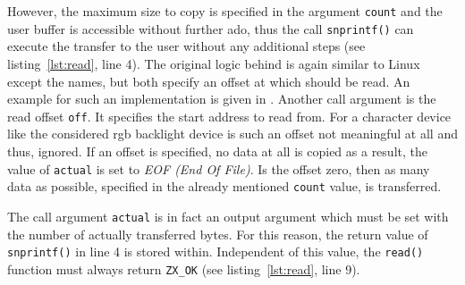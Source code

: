 However, the maximum size to copy is specified in the argument \texttt{count} and the user buffer is accessible without further ado, thus the call \texttt{snprintf()} can execute the transfer to the user without any additional steps (see listing~\ref{lst:read}, line 4).
The original logic behind is again similar to Linux except the names, but both specify an offset at which should be read.
An example for such an implementation is given in \cite{zircon-simpledrv}.
Another call argument is the read offset \texttt{off}.
It specifies the start address to read from.
For a character device like the considered \ac{rgb} backlight device is such an offset not meaningful at all and thus, ignored.
If an offset is specified, no data at all is copied as a result, the value of \texttt{actual} is set to \textit{EOF (End Of File)}.
Is the offset zero, then as many data as possible, specified in the already mentioned \texttt{count} value, is transferred.
%

The call argument \texttt{actual} is in fact an output argument which must be set with the number of actually transferred bytes.
For this reason, the return value of \texttt{snprintf()} in line 4 is stored within.
Independent of this value, the \texttt{read()} function must always return \texttt{ZX_OK} (see listing~\ref{lst:read}, line 9).

